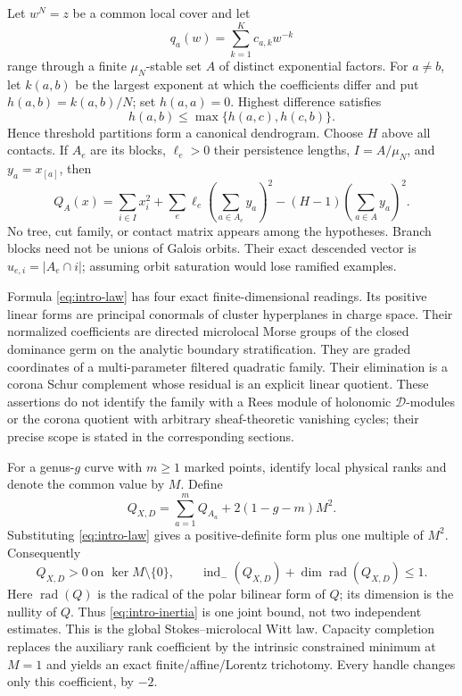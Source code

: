 \documentclass[11pt,a4paper]{amsart}
\theoremstyle{plain}
\theoremstyle{definition}
\newcommand{\indm}{\operatorname{ind}_{-}}
\newcommand{\Rad}{\operatorname{rad}}
\begin{document}
Let $w^N=z$ be a common local cover and let
\[
                         q_a(w)=\sum_{k=1}^{K}c_{a,k}w^{-k}
\]
range through a finite $\mu_N$-stable set $A$ of distinct exponential factors.  For $a\ne b$,
let $k(a,b)$ be the largest exponent at which the coefficients differ and put
$h(a,b)=k(a,b)/N$; set $h(a,a)=0$.  Highest difference satisfies
\[
                         h(a,b)\leq\max\{h(a,c),h(c,b)\}.
\]
Hence threshold partitions form a canonical dendrogram.  Choose $H$ above all contacts.  If
$A_e$ are its blocks, $\ell_e>0$ their persistence lengths, $I=A/\mu_N$, and $y_a=x_{[a]}$, then
\begin{equation}\label{eq:intro-law}
 \boxed{Q_A(x)=\sum_{i\in I}x_i^2+
        \sum_e\ell_e\left(\sum_{a\in A_e}y_a\right)^2
        -(H-1)\left(\sum_{a\in A}y_a\right)^2.}
\end{equation}
No tree, cut family, or contact matrix appears among the hypotheses.  Branch blocks need not be
unions of Galois orbits.  Their exact descended vector is
$u_{e,i}=|A_e\cap i|$; assuming orbit saturation would lose ramified examples.

Formula \eqref{eq:intro-law} has four exact finite-dimensional readings.  Its positive linear
forms are principal conormals of cluster hyperplanes in charge space.  Their normalized
coefficients are directed microlocal Morse groups of the closed dominance germ on the analytic
boundary stratification.  They are graded coordinates of a multi-parameter filtered quadratic
family.  Their elimination is a corona Schur complement whose residual is an explicit linear
quotient.  These assertions do not identify the family with a Rees module of holonomic
$\mathcal D$-modules or the corona quotient with arbitrary sheaf-theoretic vanishing cycles; their
precise scope is stated in the corresponding sections.

For a genus-$g$ curve with $m\geq1$ marked points, identify local physical ranks and denote the
common value by $M$.  Define
\begin{equation}\label{eq:intro-fusion}
                      Q_{X,D}=\sum_{a=1}^{m}Q_{A_a}+2(1-g-m)M^2.
\end{equation}
Substituting \eqref{eq:intro-law} gives a positive-definite form plus one multiple of $M^2$.
Consequently
\begin{equation}\label{eq:intro-inertia}
 Q_{X,D}>0\ \text{on }\ker M\setminus\{0\},\qquad
 \indm(Q_{X,D})+\dim\Rad(Q_{X,D})\leq1.
\end{equation}
Here $\Rad(Q)$ is the radical of the polar bilinear form of $Q$; its dimension is the nullity of
$Q$.  Thus \eqref{eq:intro-inertia} is one joint bound, not two independent estimates.  This is
the global Stokes--microlocal Witt law.  Capacity completion replaces the auxiliary rank
coefficient by the intrinsic constrained minimum at $M=1$ and yields an exact
finite/affine/Lorentz trichotomy.  Every handle changes only this coefficient, by $-2$.
\end{document}
